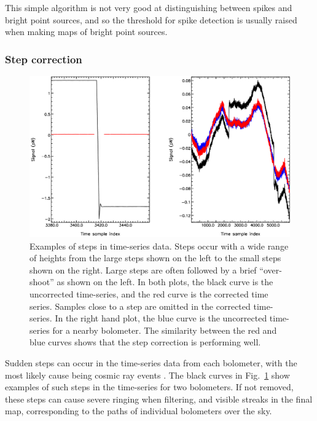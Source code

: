 \documentclass[useAMS,usenatbib,nofootinbib]{mn2e}
\begin{document}
This simple algorithm is not very good at distinguishing between spikes
and bright point sources, and so the threshold for spike detection is
usually raised when making maps of bright point sources.

\subsubsection{Step correction}
\label{sec:steps}

\begin{figure}
\centering
\includegraphics[width=\linewidth]{steps1.pdf}
\caption{Examples of steps in time-series data. Steps occur with a wide
range of heights from the large steps shown on the left to the small
steps shown on the right. Large steps are often followed by a brief
``over-shoot'' as shown on the left. In both plots, the black curve is
the uncorrected time-series, and the red curve is the corrected time
series. Samples close to a step are omitted in the corrected time-series.
In the right hand plot, the blue curve is the uncorrected time-series for
a nearby bolometer. The similarity between the red and blue curves shows
that the step correction is performing well.
}
\label{fig:steps1}
\end{figure}

Sudden steps can occur in the time-series data from each bolometer,
with the most likely cause being cosmic ray events \citep[see
Section~3.5.3 in][]{holland2012}. The black curves in
Fig.~\ref{fig:steps1} show examples of such steps in the time-series
for two bolometers. If not removed, these steps can cause severe
ringing when filtering, and visible streaks in the final map,
corresponding to the paths of individual bolometers over the sky.
\end{document}
